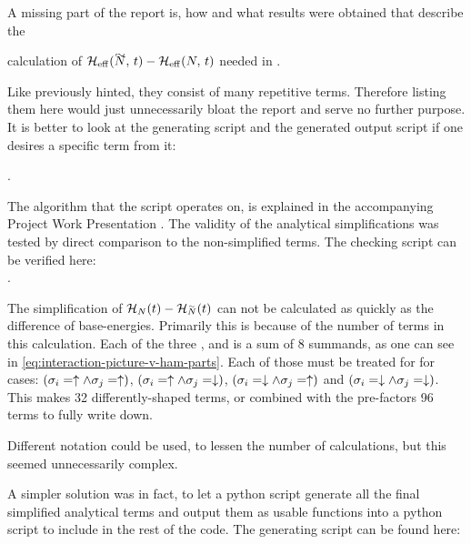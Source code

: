 
A missing part of the report is, how and what results were obtained that describe the 

 calculation of $\HeffOft[\vphantom{N}\smash{\tilde{N}}]-\HeffOft[N]$ needed in .

Like previously hinted, they consist of many repetitive terms.
Therefore listing them here would just unnecessarily bloat the report and serve no further purpose.
It is better to look at the generating script 
and the generated output script if one desires a specific term from it:

.

The algorithm that the script operates on, is explained in the accompanying Project Work Presentation  \cite{selfDocument}.
The validity of the analytical simplifications was tested by direct comparison to the non-simplified terms.
The checking script can be verified here:\\
.


The simplification of $\HNOft - \HNOft[\vphantom{N}\smash{\tilde{N}}]$ can not be calculated as quickly as the difference of base-energies.
Primarily this is because of the number of terms in this calculation. Each of the three ,  and  is a sum of 8 summands, as one can see in \autoref{eq:interaction-picture-v-ham-parts}.
Each of those must be treated for for cases: $(\sigma_i = \uparrow \land \sigma_j = \uparrow)$, $(\sigma_i = \uparrow \land \sigma_j = \downarrow)$, $(\sigma_i = \downarrow \land \sigma_j = \uparrow)$ and $(\sigma_i = \downarrow \land \sigma_j = \downarrow)$.
This makes 32 differently-shaped terms, or combined with the pre-factors 96 terms to fully write down.

Different notation could be used, to lessen the number of calculations, but this seemed unnecessarily complex.

A simpler solution was in fact, to let a python script generate all the final simplified analytical terms and output them as usable functions into a python script to include in the rest of the code.
The generating script can be found here: 


